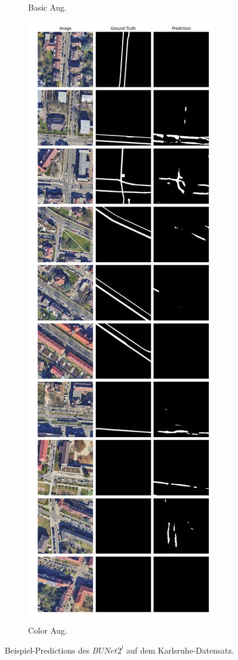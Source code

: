 \begin{figure}
\begin{subfigure}{.4\textwidth}
		\caption{Basic Aug.}
	\end{subfigure}
	\begin{subfigure}{.4\textwidth}
		\centering
		\includegraphics[width=1.\textwidth]{Bilder/karlsruhe-color-samples/bunet2-l.png}
		\caption{Color Aug.}
	\end{subfigure}
	\label{fig:ka-samples-bunet2-l}
	\caption{Beispiel-Predictions des $BUNet2^l$ auf dem Karlsruhe-Datensatz.}
	\end{figure}
	
